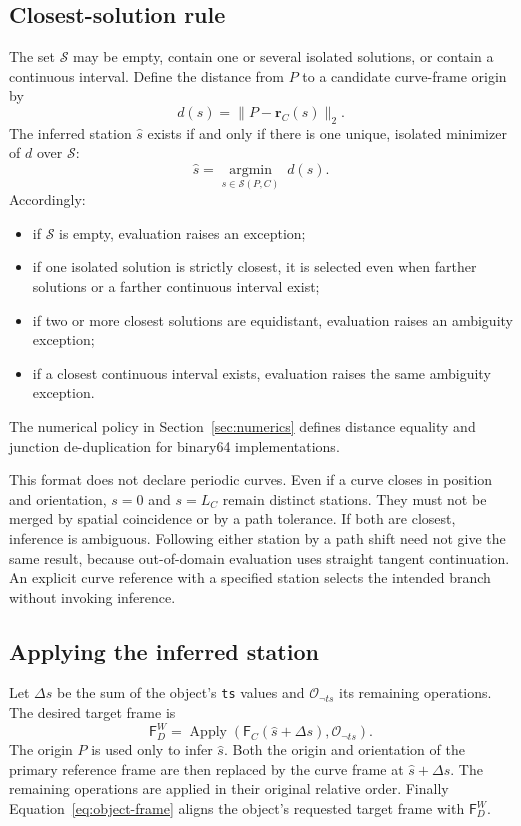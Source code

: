 \documentclass[11pt,a4paper]{article}
\newcommand{\Frame}{\mathsf{F}}
\newcommand{\Apply}{\operatorname{Apply}}
\newcommand{\ops}{\mathcal{O}}
\begin{document}
\subsection{Closest-solution rule}

The set $\mathcal{S}$ may be empty, contain one or several isolated solutions,
or contain a continuous interval.  Define the distance from $P$ to a candidate
curve-frame origin by
\begin{equation}
  d(s)=\lVert P-\mathbf{r}_C(s)\rVert_2.
\end{equation}
The inferred station $\widehat{s}$ exists if and only if there is one unique,
isolated minimizer of $d$ over $\mathcal{S}$:
\begin{equation}
  \widehat{s}
  =\underset{s\in\mathcal{S}(P,C)}{\operatorname{argmin}}\;d(s).
  \label{eq:closest-station}
\end{equation}
Accordingly:
\begin{itemize}
  \item if $\mathcal{S}$ is empty, evaluation raises an exception;
  \item if one isolated solution is strictly closest, it is selected even when
        farther solutions or a farther continuous interval exist;
  \item if two or more closest solutions are equidistant, evaluation raises an
        ambiguity exception;
  \item if a closest continuous interval exists, evaluation raises the same
        ambiguity exception.
\end{itemize}
The numerical policy in Section~\ref{sec:numerics} defines distance equality
and junction de-duplication for binary64 implementations.

This format does not declare periodic curves. Even if a curve closes in
position and orientation, $s=0$ and $s=L_C$ remain distinct stations. They
must not be merged by spatial coincidence or by a path tolerance. If both
are closest, inference is ambiguous. Following either station by a path shift
need not give the same result, because out-of-domain evaluation uses straight
tangent continuation. An explicit curve reference with a specified station
selects the intended branch without invoking inference.

\subsection{Applying the inferred station}

Let $\Delta s$ be the sum of the object's \texttt{ts} values and
$\ops_{\neg ts}$ its remaining operations.  The desired target frame is
\begin{equation}
  \boxed{
  \Frame_D^W
  =\Apply\!\left(\Frame_C(\widehat{s}+\Delta s),
                  \ops_{\neg ts}\right)}.
  \label{eq:inferred-position}
\end{equation}
The origin $P$ is used only to infer $\widehat{s}$.  Both the origin and
orientation of the primary reference frame are then replaced by the curve frame
at $\widehat{s}+\Delta s$.  The remaining operations are applied in their
original relative order.  Finally Equation~\eqref{eq:object-frame} aligns the
object's requested target frame with $\Frame_D^W$.
\end{document}

